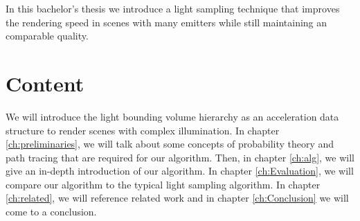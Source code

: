 In this bachelor's thesis we introduce a light sampling technique that improves the rendering speed in scenes with many emitters while still maintaining an comparable quality.

\section{Content}
\label{sec:Introduction:Content}

We will introduce the light bounding volume hierarchy as an acceleration data structure to render scenes with complex illumination. In chapter \ref{ch:preliminaries}, we will talk about some concepts of probability theory and path tracing that are required for our algorithm. Then, in chapter \ref{ch:alg}, we will give an in-depth introduction of our algorithm. In chapter \ref{ch:Evaluation}, we will compare our algorithm to the typical light sampling algorithm. In chapter \ref{ch:related}, we will reference related work and in chapter \ref{ch:Conclusion} we will come to a conclusion.